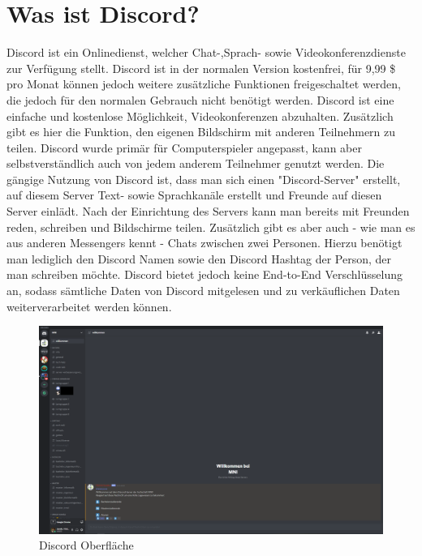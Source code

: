 \documentclass[sigplan,screen]{acmart}
\begin{document}
\section{Was ist Discord?}
Discord ist ein Onlinedienst, welcher Chat-,Sprach- sowie Videokonferenzdienste zur
Verfügung stellt. Discord ist in der normalen Version kostenfrei, für 9,99 \$ pro Monat
können jedoch weitere zusätzliche Funktionen freigeschaltet werden, die jedoch für den
normalen Gebrauch nicht benötigt werden. Discord ist
eine einfache und kostenlose Möglichkeit, Videokonferenzen abzuhalten. Zusätzlich gibt
es hier die Funktion, den eigenen Bildschirm mit anderen Teilnehmern zu teilen.
Discord wurde primär für Computerspieler angepasst, kann aber selbstverständlich auch
von jedem anderem Teilnehmer genutzt werden. 
Die gängige Nutzung von Discord ist,
dass man sich einen "Discord-Server" erstellt, auf diesem Server Text- sowie Sprachkanäle
erstellt und Freunde auf diesen Server einlädt. Nach der Einrichtung des Servers kann
man bereits mit Freunden reden, schreiben und Bildschirme teilen.
Zusätzlich gibt es aber auch - wie man es aus anderen Messengers kennt - Chats zwischen
zwei Personen. Hierzu benötigt man lediglich den Discord Namen sowie den Discord
Hashtag der Person, der man schreiben möchte. \cite{dis1}
Discord bietet jedoch keine End-to-End Verschlüsselung an, sodass sämtliche Daten von Discord mitgelesen und zu verkäuflichen Daten weiterverarbeitet werden können. \cite{discover}

\begin{figure}[h]
  \centering
  \includegraphics[width=\linewidth]{discord_server}
  \caption{Discord Oberfläche}
\end{figure}
\end{document}
